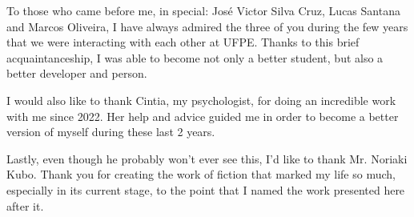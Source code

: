 \begin{spacing}{1.0}
To those who came before me, in special: José Victor Silva Cruz, Lucas Santana and Marcos Oliveira, I have always admired the three of you during the few years that we were interacting with each other at UFPE. Thanks to this brief acquaintanceship, I was able to become not only a better student, but also a better developer and person. 

I would also like to thank Cintia, my psychologist, for doing an incredible work with me since 2022. Her help and advice guided me in order to become a better version of myself during these last 2 years.

Lastly, even though he probably won't ever see this, I'd like to thank Mr. Noriaki Kubo. Thank you for creating the work of fiction that marked my life so much, especially in its current stage, to the point that I named the work presented here after it.
    
\clearpage
\end{spacing}